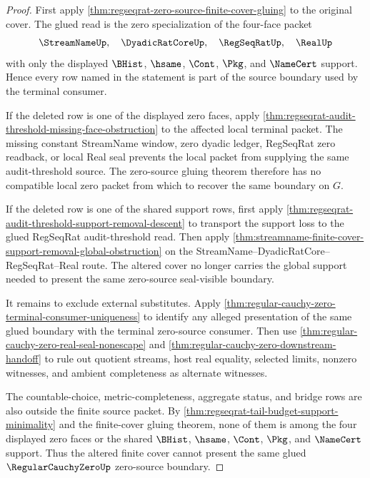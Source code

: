 \begin{proof}
First apply \autoref{thm:regseqrat-zero-source-finite-cover-gluing} to the original cover. The glued read is the zero specialization of the four-face packet
$$
\StreamNameUp,\quad \DyadicRatCoreUp,\quad \RegSeqRatUp,\quad \RealUp
$$
with only the displayed $\BHist$, $\hsame$, $\Cont$, $\Pkg$, and $\NameCert$ support. Hence every row named in the statement is part of the source boundary used by the terminal consumer.

If the deleted row is one of the displayed zero faces, apply \autoref{thm:regseqrat-audit-threshold-missing-face-obstruction} to the affected local terminal packet. The missing constant StreamName window, zero dyadic ledger, RegSeqRat zero readback, or local Real seal prevents the local packet from supplying the same audit-threshold source. The zero-source gluing theorem therefore has no compatible local zero packet from which to recover the same boundary on $G$.

If the deleted row is one of the shared support rows, first apply \autoref{thm:regseqrat-audit-threshold-support-removal-descent} to transport the support loss to the glued RegSeqRat audit-threshold read. Then apply \autoref{thm:streamname-finite-cover-support-removal-global-obstruction} on the StreamName--DyadicRatCore--RegSeqRat--Real route. The altered cover no longer carries the global support needed to present the same zero-source seal-visible boundary.

It remains to exclude external substitutes. Apply \autoref{thm:regular-cauchy-zero-terminal-consumer-uniqueness} to identify any alleged presentation of the same glued boundary with the terminal zero-source consumer. Then use \autoref{thm:regular-cauchy-zero-real-seal-nonescape} and \autoref{thm:regular-cauchy-zero-downstream-handoff} to rule out quotient streams, host real equality, selected limits, nonzero witnesses, and ambient completeness as alternate witnesses.

The countable-choice, metric-completeness, aggregate status, and bridge rows are also outside the finite source packet. By \autoref{thm:regseqrat-tail-budget-support-minimality} and the finite-cover gluing theorem, none of them is among the four displayed zero faces or the shared $\BHist$, $\hsame$, $\Cont$, $\Pkg$, and $\NameCert$ support. Thus the altered finite cover cannot present the same glued $\RegularCauchyZeroUp$ zero-source boundary.
\end{proof}
